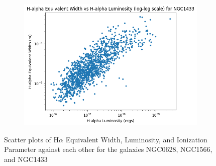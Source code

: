 \documentclass[12pt]{report}
\begin{document}
\begin{figure}[htbp]
    \hfill
    \begin{subfigure}{0.3\textwidth}
        \centering
        \includegraphics[width=\linewidth]{image12.png}
        \label{fig:image12}
    \end{subfigure}
    
    \small
    \caption{Scatter plots of H$\alpha$ Equivalent Width, Luminosity, and Ionization Parameter against each other for the galaxies NGC0628, NGC1566, and NGC1433}
    \label{fig:grid_of_images}
\end{figure}
\end{document}

